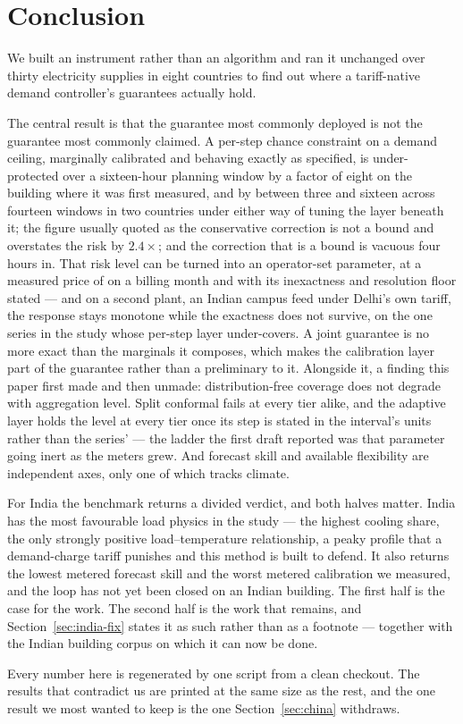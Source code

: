 \section{Conclusion}

We built an instrument rather than an algorithm and ran it unchanged over thirty
electricity supplies in eight countries to find out where a tariff-native demand
controller's guarantees actually hold.

The central result is that the guarantee most commonly deployed is not the
guarantee most commonly claimed. A per-step chance constraint on a demand
ceiling, marginally calibrated and behaving exactly as specified, is
under-protected over a sixteen-hour planning window by a factor of eight on the
building where it was first measured, and by between three and sixteen across
fourteen windows in two countries under either way of tuning the layer beneath
it; the
figure usually quoted as the conservative correction is not a bound and
overstates the risk by $2.4\times$; and the correction that is a bound is
vacuous four hours in. That risk level can be turned into an operator-set
parameter, at a measured price of  on a billing month and with
its inexactness and resolution floor stated --- and on a second plant, an
Indian campus feed under Delhi's own tariff, the response stays monotone while
the exactness does not survive, on the one series in the study whose per-step
layer under-covers. A joint guarantee is no more exact than the marginals it
composes, which makes the calibration layer part of the guarantee rather than
a preliminary to it. Alongside it, a finding this
paper first made and then unmade: distribution-free coverage does not degrade
with aggregation level. Split conformal fails at every tier alike, and the
adaptive layer holds the level at every tier once its step is stated in the
interval's units rather than the series' --- the ladder the first draft
reported was that parameter going inert as the meters grew. And forecast skill and available
flexibility are independent axes, only one of which tracks climate.

For India the benchmark returns a divided verdict, and both halves matter. India
has the most favourable load physics in the study --- the highest cooling share,
the only strongly positive load--temperature relationship, a peaky profile that
a demand-charge tariff punishes and this method is built to defend. It also
returns the lowest metered forecast skill and the worst metered calibration we
measured, and the loop has not yet been closed on an Indian building. The first
half is the case for the work. The second half is the work that remains, and
Section~\ref{sec:india-fix} states it as such rather than as a footnote ---
together with the Indian building corpus on which it can now be done.

Every number here is regenerated by one script from a clean checkout. The
results that contradict us are printed at the same size as the rest, and the one
result we most wanted to keep is the one Section~\ref{sec:china} withdraws.
